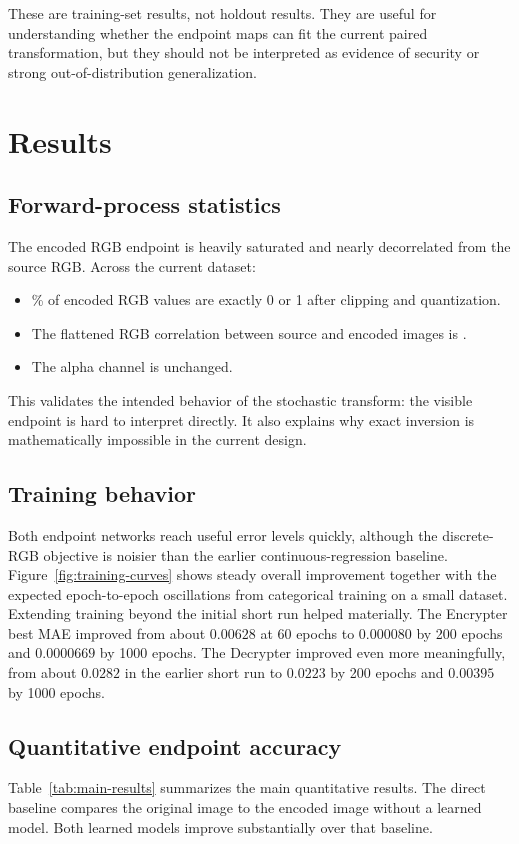 \documentclass[11pt]{article}
\begin{document}
These are training-set results, not holdout results. They are useful for understanding whether the endpoint maps can fit the current paired transformation, but they should not be interpreted as evidence of security or strong out-of-distribution generalization.

\section{Results}
\subsection{Forward-process statistics}
The encoded RGB endpoint is heavily saturated and nearly decorrelated from the source RGB. Across the current dataset:
\begin{itemize}
    \item \EncodedSaturationPct\% of encoded RGB values are exactly 0 or 1 after clipping and quantization.
    \item The flattened RGB correlation between source and encoded images is \EncodedRGBCorrelation.
    \item The alpha channel is unchanged.
\end{itemize}

This validates the intended behavior of the stochastic transform: the visible endpoint is hard to interpret directly. It also explains why exact inversion is mathematically impossible in the current design.

\subsection{Training behavior}
Both endpoint networks reach useful error levels quickly, although the discrete-RGB objective is noisier than the earlier continuous-regression baseline. Figure~\ref{fig:training-curves} shows steady overall improvement together with the expected epoch-to-epoch oscillations from categorical training on a small dataset. Extending training beyond the initial short run helped materially. The Encrypter best MAE improved from about $0.00628$ at 60 epochs to $0.000080$ by 200 epochs and $0.0000669$ by 1000 epochs. The Decrypter improved even more meaningfully, from about $0.0282$ in the earlier short run to $0.0223$ by 200 epochs and $0.00395$ by 1000 epochs.

\subsection{Quantitative endpoint accuracy}
Table~\ref{tab:main-results} summarizes the main quantitative results. The direct baseline compares the original image to the encoded image without a learned model. Both learned models improve substantially over that baseline.
\end{document}
